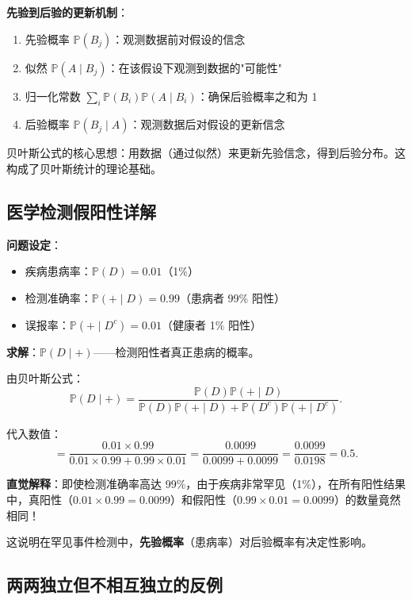 \textbf{先验到后验的更新机制}：
\begin{enumerate}
\item 先验概率 $\mathbb{P}(B_j)$：观测数据前对假设的信念
\item 似然 $\mathbb{P}(A \mid B_j)$：在该假设下观测到数据的"可能性"
\item 归一化常数 $\sum_i \mathbb{P}(B_i) \mathbb{P}(A \mid B_i)$：确保后验概率之和为 1
\item 后验概率 $\mathbb{P}(B_j \mid A)$：观测数据后对假设的更新信念
\end{enumerate}

贝叶斯公式的核心思想：用数据（通过似然）来更新先验信念，得到后验分布。这构成了贝叶斯统计的理论基础。

\subsection{医学检测假阳性详解}\label{sec:derivation-medical-test-false-positive}

\textbf{问题设定}：
\begin{itemize}
\item 疾病患病率：$\mathbb{P}(D) = 0.01$（1\%）
\item 检测准确率：$\mathbb{P}(+ \mid D) = 0.99$（患病者 99\% 阳性）
\item 误报率：$\mathbb{P}(+ \mid D^c) = 0.01$（健康者 1\% 阳性）
\end{itemize}

\textbf{求解}：$\mathbb{P}(D \mid +)$——检测阳性者真正患病的概率。

由贝叶斯公式：
\[
\mathbb{P}(D \mid +) = \frac{\mathbb{P}(D) \mathbb{P}(+ \mid D)}{\mathbb{P}(D) \mathbb{P}(+ \mid D) + \mathbb{P}(D^c) \mathbb{P}(+ \mid D^c)}.
\]

代入数值：
\[
= \frac{0.01 \times 0.99}{0.01 \times 0.99 + 0.99 \times 0.01} = \frac{0.0099}{0.0099 + 0.0099} = \frac{0.0099}{0.0198} = 0.5.
\]

\textbf{直觉解释}：即使检测准确率高达 99\%，由于疾病非常罕见（1\%），在所有阳性结果中，真阳性（$0.01 \times 0.99 = 0.0099$）和假阳性（$0.99 \times 0.01 = 0.0099$）的数量竟然相同！

这说明在罕见事件检测中，\textbf{先验概率}（患病率）对后验概率有决定性影响。

\subsection{两两独立但不相互独立的反例}\label{sec:derivation-pairwise-not-mutual}

